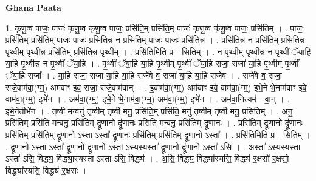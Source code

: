 \documentclass[17pt]{extarticle}
\begin{document}
\textbf{Ghana Paata } \newline

1. कृ॒णु॒ष्व पाजः॒ पाजः॑ कृणु॒ष्व कृ॑णु॒ष्व पाजः॒ प्रसि॑ति॒म् प्रसि॑ति॒म् पाजः॑ कृणु॒ष्व कृ॑णु॒ष्व पाजः॒ प्रसि॑तिम् । . पाजः॒ प्रसि॑ति॒म् प्रसि॑ति॒म् पाजः॒ पाजः॒ प्रसि॑ति॒न्न न प्रसि॑ति॒म् पाजः॒ पाजः॒ प्रसि॑ति॒न्न । . प्रसि॑ति॒न्न न प्रसि॑ति॒म् प्रसि॑ति॒न्न पृ॒थ्वीम् पृ॒थ्वीन्न प्रसि॑ति॒म् प्रसि॑ति॒न्न पृ॒थ्वीम् । . प्रसि॑ति॒मिति॒ प्र - सि॒ति॒म् । . न पृ॒थ्वीम् पृ॒थ्वीन्न न पृ॒थ्वीं ॅया॒हि या॒हि पृ॒थ्वीन्न न पृ॒थ्वीं ॅया॒हि । . पृ॒थ्वीं ॅया॒हि या॒हि पृ॒थ्वीम् पृ॒थ्वीं ॅया॒हि राजा॒ राजा॑ या॒हि पृ॒थ्वीम् पृ॒थ्वीं ॅया॒हि राजा᳚ । . या॒हि राजा॒ राजा॑ या॒हि या॒हि राजे॑वे व॒ राजा॑ या॒हि या॒हि राजे॑व । . राजे॑वे व॒ राजा॒ राजे॒वाम॑वा॒(ग्म्॒) अम॑वाꣳ इव॒ राजा॒ राजे॒वाम॑वान् । . इ॒वाम॑वा॒(ग्म्॒) अम॑वाꣳ इवे॒ वाम॑वा॒(ग्म्॒) इभे॒ने भे॒नाम॑वाꣳ इवे॒ वाम॑वा॒(ग्म्॒) इभे॑न । . अम॑वा॒(ग्म्॒) इभे॒ने भे॒नाम॑वा॒(ग्म्॒) अम॑वा॒(ग्म्॒) इभे॑न । . अम॑वा॒नित्यम॑ - वा॒न् । . इभे॒नेतीभे॑न । . तृ॒ष्वी मन्वनु॑ तृ॒ष्वीम् तृ॒ष्वी मनु॒ प्रसि॑ति॒म् प्रसि॑ति॒ मनु॑ तृ॒ष्वीम् तृ॒ष्वी मनु॒ प्रसि॑तिम् । . अनु॒ प्रसि॑ति॒म् प्रसि॑ति॒ मन्वनु॒ प्रसि॑तिम् द्रूणा॒नो द्रू॑णा॒नः प्रसि॑ति॒ मन्वनु॒ प्रसि॑तिम् द्रूणा॒नः । . प्रसि॑तिम् द्रूणा॒नो द्रू॑णा॒नः प्रसि॑ति॒म् प्रसि॑तिम् द्रूणा॒नो ऽस्ता ऽस्ता᳚ द्रूणा॒नः प्रसि॑ति॒म् प्रसि॑तिम् द्रूणा॒नो ऽस्ता᳚ । . प्रसि॑ति॒मिति॒ प्र - सि॒ति॒म् । . द्रू॒णा॒नो ऽस्ता ऽस्ता᳚ द्रूणा॒नो द्रू॑णा॒नो ऽस्ता᳚ ऽस्य॒स्यस्ता᳚ द्रूणा॒नो द्रू॑णा॒नो ऽस्ता॑ ऽसि । . अस्ता᳚ ऽस्य॒स्यस्ता ऽस्ता॑ ऽसि॒ विद्ध्य॒ विद्ध्या॒स्यस्ता ऽस्ता॑ ऽसि॒ विद्ध्य॑ । . अ॒सि॒ विद्ध्य॒ विद्ध्या᳚स्यसि॒ विद्ध्य॑ र॒क्षसो॑ र॒क्षसो॒ विद्ध्या᳚स्यसि॒ विद्ध्य॑ र॒क्षसः॑ । \newline
\end{document}
